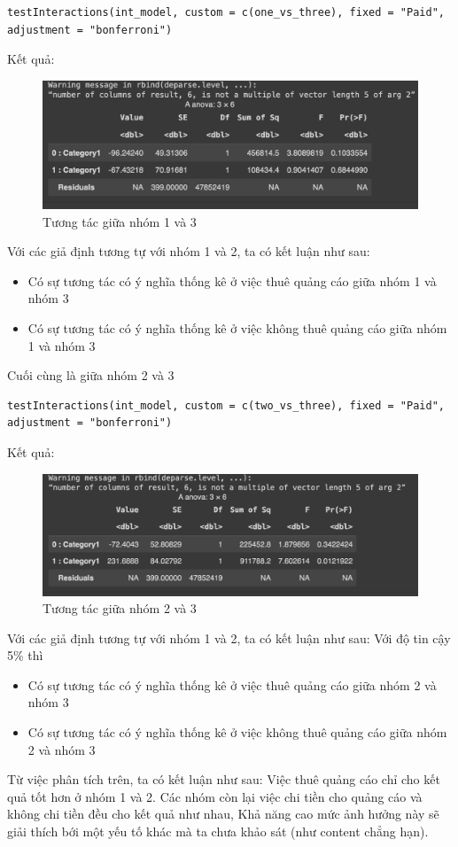 \begin{itemize}
\begin{itemize}
\begin{itemize}
        \begin{lstlisting}
testInteractions(int_model, custom = c(one_vs_three), fixed = "Paid", adjustment = "bonferroni")
        \end{lstlisting}
        Kết quả:
        \begin{figure}[H]
            \centering
            \includegraphics[width=0.5\linewidth]{part23_figures/12.png}
            \caption{Tương tác giữa nhóm 1 và 3}
            \label{fig:Tương tác giữa nhóm 1 và 3}
        \end{figure}
        Với các giả định tương tự với nhóm 1 và 2, ta có kết luận như sau:
        \begin{itemize}
            \item Có sự tương tác có ý nghĩa thống kê ở việc thuê quảng cáo giữa nhóm 1 và nhóm 3
            \item Có sự tương tác có ý nghĩa thống kê ở việc không thuê quảng cáo giữa nhóm 1 và nhóm 3
        \end{itemize}
        Cuối cùng là giữa nhóm 2 và 3
        \begin{lstlisting}
testInteractions(int_model, custom = c(two_vs_three), fixed = "Paid", adjustment = "bonferroni")
        \end{lstlisting}
        Kết quả:
        \begin{figure}[H]
            \centering
            \includegraphics[width=0.5\linewidth]{part23_figures/13.png}
            \caption{Tương tác giữa nhóm 2 và 3}
            \label{fig:Tương tác giữa nhóm 2 và 3}
        \end{figure}
         Với các giả định tương tự với nhóm 1 và 2, ta có kết luận như sau: Với độ tin cậy 5\% thì \begin{itemize}
             \item Có sự tương tác có ý nghĩa thống kê ở việc thuê quảng cáo giữa nhóm 2 và nhóm 3
             \item Có sự tương tác có ý nghĩa thống kê ở việc không thuê quảng cáo giữa nhóm 2 và nhóm 3
         \end{itemize}
    \end{itemize}
    Từ việc phân tích trên, ta có kết luận như sau: Việc thuê quảng cáo chỉ cho kết quả tốt hơn ở nhóm 1 và 2. Các nhóm còn lại việc chi tiền cho quảng cáo và không chi tiền đều cho kết quả như nhau, Khả năng cao mức ảnh hưởng này sẽ giải thích bới một yếu tố khác mà ta chưa khảo sát (như content chẳng hạn).


\end{itemize}
\end{itemize}
